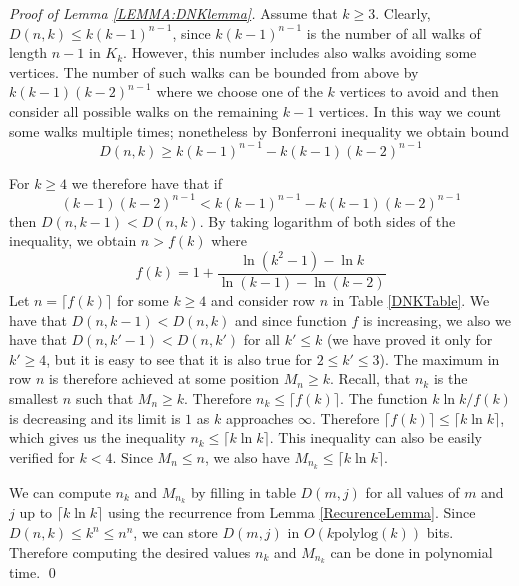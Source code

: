 \begin{proof}[Proof of Lemma \ref{LEMMA:DNKlemma}] 
Assume that $k\ge 3$. Clearly, $D(n,k)\leq k(k-1)^{n-1}$, since
$k(k-1)^{n-1}$ is the number of all walks of length $n-1$ in
$K_k$. However, this number includes also walks avoiding some
vertices. The number of such walks can be bounded from above by
$k(k-1)(k-2)^{n-1}$ where we choose one of the $k$ vertices to avoid
and then consider all possible walks on the remaining $k-1$
vertices. In this way we count some walks multiple times; nonetheless
by Bonferroni inequality we obtain bound $$D(n,k)\geq
k(k-1)^{n-1}-k(k-1)(k-2)^{n-1}$$

For $k\ge 4$ we therefore have that if
$$(k-1)(k-2)^{n-1}<k(k-1)^{n-1}-k(k-1)(k-2)^{n-1}$$ then
$D(n,k-1)<D(n,k)$.  By taking logarithm of both sides of the inequality, we
obtain $n>f(k)$ where $$f(k) = 1+\frac{\ln(k^2-1)-\ln
  k}{\ln(k-1)-\ln(k-2)}$$  Let $n = \lceil f(k)\rceil$ for some $k\ge
4$ and consider row $n$ in Table \ref{DNKTable}.
We have that $D(n,k-1)<D(n,k)$ and since function $f$ is
increasing, we also we have that $D(n,k'-1)<D(n,k')$ for all $k'\le k$ 
(we have proved it only for $k'\ge 4$, but it is easy to see that it is
also true for $2\le k'\le 3$). The maximum in row $n$ is therefore
achieved at some position $M_n \ge k$. Recall, that $n_k$ is the
smallest $n$ such that $M_n\ge k$. Therefore $n_k\leq \lceil f(k)\rceil$.
The function $k \ln k/f(k)$ is decreasing and its limit is $1$ as $k$
approaches $\infty$. Therefore $\lceil f(k)\rceil\leq\lceil k\ln k\rceil$,
which gives us the inequality $n_k\le \lceil k \ln k\rceil$. This inequality 
can also be easily verified for $k<4$. Since $M_n\le n$,
we also have $M_{n_k}\le \lceil k \ln k\rceil$. 

We can compute $n_k$ and $M_{n_k}$ by filling in table $D(m,j)$ for
all values of $m$ and $j$ up to $\lceil k\ln k\rceil$ using the
recurrence from Lemma \ref{RecurenceLemma}. Since $D(n,k)\leq k^n\leq
n^n$, we can store $D(m,j)$ in $O(k \mbox{polylog}(k))$ bits.
Therefore computing the desired values $n_k$ and $M_{n_k}$ 
can be done in polynomial time. \qed
\end{proof}


